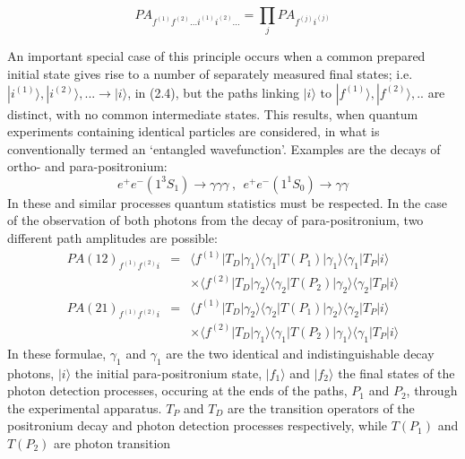 \documentclass [12pt]{article}
\begin{document}
{\begin{itemize}
   \begin{equation}   
    PA_{f^{(1)}f^{(2)}...i^{(1)}i^{(2)}...} = \prod_j PA_{f^{(j)}i^{(j)}} 
    \end{equation}
 \end{itemize} 
    An important special case of this principle occurs when a common prepared initial state
    gives rise to a number of separately measured final states; i.e.  $|i^{(1)}\rangle, |i^{(2)}\rangle,...
     \rightarrow |i\rangle$, in (2.4), but the paths linking $|i\rangle$ to
      $|f^{(1)}\rangle, |f^{(2)}\rangle,..$ are distinct, with no common intermediate states.
     This results, when quantum experiments containing identical particles are considered,
    in what is conventionally termed an `entangled wavefunction'. Examples are the decays
   of ortho- and para-positronium:
   \[ e^+e^-\left(1^3S_1\right) \rightarrow \gamma \gamma \gamma~,~~
    e^+e^-\left(1^1S_0\right) \rightarrow \gamma \gamma \]
     In these and similar processes quantum statistics must be respected.
     In the case of the observation of both photons from the decay of para-positronium,
     two different path amplitudes are possible:
     \begin{eqnarray}
     PA(12)_{f^{(1)}f^{(2)}i} & = & \langle f^{(1)}|T_D|\gamma_1\rangle \langle\gamma_1 |T(P_1)|\gamma_1\rangle
                           \langle\gamma_1 |T_{P}| i\rangle  \nonumber \\
                      &   & \times  \langle f^{(2)}|T_D|\gamma_2\rangle \langle\gamma_2 |T(P_2)|\gamma_2 \rangle
                           \langle \gamma_2 |T_{P}| i \rangle  \\
     PA(21)_{f^{(1)}f^{(2)}i} & = & \langle f^{(1)}|T_D|\gamma_2\rangle \langle\gamma_2 |T(P_1)|\gamma_2\rangle
                           \langle \gamma_2 |T_{P}| i\rangle  \nonumber \\
                      &   &  \times \langle f^{(2)}|T_D|\gamma_1\rangle \langle \gamma_1 |T(P_2)|\gamma_1 \rangle
                           \langle \gamma_1 |T_{P}| i \rangle  
     \end{eqnarray}
    In these formulae, $\gamma_1$ and  $\gamma_1$ are the two identical and indistinguishable decay
   photons, $|i\rangle$ the initial para-positronium state, $|f_1\rangle$ and $|f_2 \rangle$ 
   the final states of the
   photon detection processes, occuring at the ends of the paths, $P_1$ and $P_2$, through the experimental
   apparatus. $T_P$ and $T_D$ are the transition operators of the positronium decay and photon 
   detection processes respectively, while $T(P_1)$ and $T(P_2)$ are photon transition 
}
\end{document}

